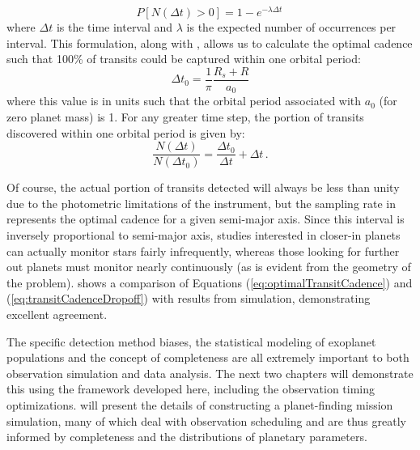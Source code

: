\begin{equation}
P[N(\Delta t) > 0] = 1 - e^{-\lambda \Delta t} \,
\end{equation}
where $\Delta t$ is the time interval and $\lambda$ is the expected number of occurrences per interval.  This formulation, along with , allows us to calculate the optimal cadence such that 100\% of transits could be captured within one orbital period:
\begin{equation}\label{eq:optimalTransitCadence}
\Delta t_0 = \frac{1}{\pi} \frac{R_s + R}{a_0}
\end{equation}
where this value is in units such that the orbital period associated with $a_0$ (for zero planet mass) is 1.  For any greater time step, the portion of transits discovered within one orbital period is given by:
\begin{equation}\label{eq:transitCadenceDropoff}
\frac{N(\Delta t)}{N(\Delta t_0)} = \frac{\Delta t_0}{\Delta t} + \Delta t \,.
\end{equation}

Of course, the actual portion of transits detected will always be less than unity due to the photometric limitations of the instrument, but the sampling rate in  represents the optimal cadence for a given semi-major axis.  Since this interval is inversely proportional to semi-major axis, studies interested in closer-in planets can actually monitor stars fairly infrequently, whereas those looking for further out planets must monitor nearly continuously (as is evident from the geometry of the problem).   shows a comparison of  Equations (\ref{eq:optimalTransitCadence}) and (\ref{eq:transitCadenceDropoff}) with results from simulation, demonstrating excellent agreement.

\bigskip
\bigskip

The specific detection method biases, the statistical modeling of exoplanet populations and the concept of completeness are all extremely important to both observation simulation and data analysis.  The next two chapters will demonstrate this using the framework developed here, including the observation timing optimizations.   will present the details of constructing a planet-finding mission simulation, many of which deal with observation scheduling and are thus greatly informed by completeness and the distributions of planetary parameters. 
